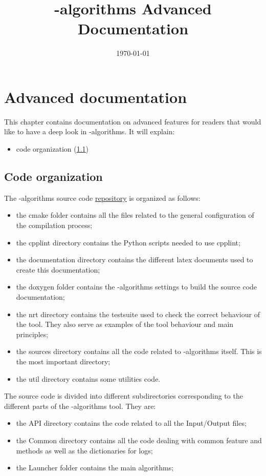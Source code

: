 \documentclass[a4paper, 12pt]{report}
\begin{document}
\title{\Dynawo-algorithms Advanced Documentation}
\date\today

\maketitle
\tableofcontents

\chapter{Advanced documentation}

This chapter contains documentation on advanced features for readers that would like to have a deep look in \Dynawo-algorithms. It will explain:
\begin{itemize}
\item \Dynawo code organization (\ref{Dynawo_Algorithms_Advanced_Documentation_Code_Organization})
\end{itemize}

\section{Code organization}
\label{Dynawo_Algorithms_Advanced_Documentation_Code_Organization}

The \Dynawo-algorithms source code \href{https://github.com/dynawo/dynawo-algorithms.git}
{\underline{repository}} is organized as follows:
\begin{itemize}
\item the cmake folder contains all the files related to the general
configuration of the compilation process;
\item the cpplint directory contains the Python scripts needed to use cpplint;
\item the documentation directory contains the different latex documents used to
create this documentation;
\item the doxygen folder contains the \Dynawo-algorithms settings to build the source code
documentation;
\item the nrt directory contains the testsuite used to check the correct
behaviour of the tool. They also serve as examples of the 
tool behaviour and main principles;
\item the sources directory contains all the code related to \Dynawo-algorithms itself. This is the most important directory;
\item the util directory contains some utilities code.
\end{itemize}

The source code is divided into different subdirectories corresponding to the different parts of the \Dynawo-algorithms tool. They are:
\begin{itemize}
\item the API directory contains the code related to all the Input/Output
files;
\item the Common directory contains all the code dealing with common feature and methods as well as the dictionaries for logs;
\item the Launcher folder contains the main algorithms;
\end{itemize}
\end{document}
